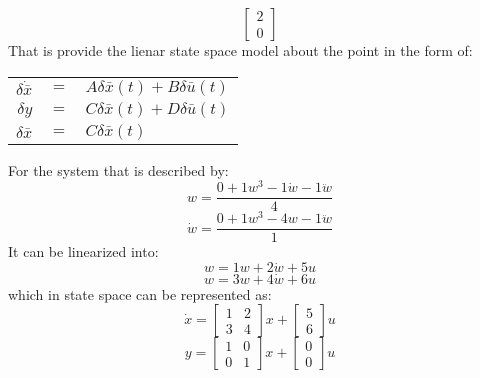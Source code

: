 \begin{enumerate}
  \label{one_equilibrium}
  \begin{equation}
    \begin{bmatrix}
2\\
0
\end{bmatrix}
\end{equation}
  That is provide the lienar state space model about the point in the form of:
  \begin{center}
    \begin{tabular}{r c l}
      $\delta \dot{\bar x}$ & $=$ & $A\delta\bar{x}(t) + B\delta\bar{u}(t)$\\
      $\delta y$ & $=$ & $C\delta\bar x(t) + D\delta\bar u(t)$\\
      $\delta \bar x$ & $=$ & $C\delta\bar x(t)$
    \end{tabular}
  \end{center}
  For the system that is described by:
  \begin{equation}
    w = \frac{0 + 1w^3 - 1\dot w - 1\ddot w}{4}
  \end{equation}
  \begin{equation}
    \dot w = \frac{0 + 1w^3 - 4w- 1\ddot w}{1}
  \end{equation}
  It can be linearized into:
  \begin{equation}
    w = 1w + 2\dot w + 5u
  \end{equation}
  \begin{equation}
    w = 3w + 4\dot w + 6u
  \end{equation}
  which in state space can be represented as:
  \begin{equation}
\dot x = \begin{bmatrix}
1 & 2\\
3 & 4
\end{bmatrix}
x + \begin{bmatrix}
5\\
6
\end{bmatrix}
u\end{equation}
\begin{equation}
y = \begin{bmatrix}
1 & 0\\
0 & 1
\end{bmatrix}
x + \begin{bmatrix}
0\\
0
\end{bmatrix}
u\end{equation}

\end{enumerate}
